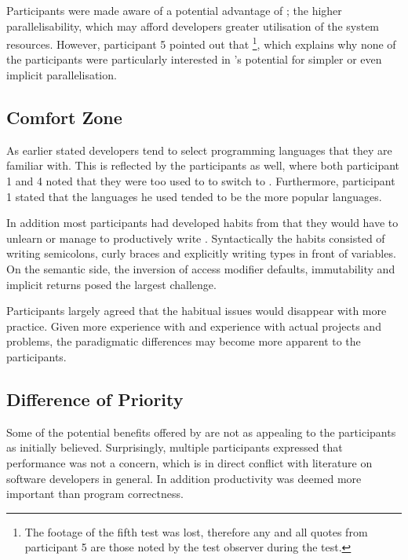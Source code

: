 Participants were made aware of a potential advantage of \fs; the higher parallelisability, which may afford developers greater utilisation of the system resources. However, participant 5 pointed out that \footnote{The footage of the fifth test was lost, therefore any and all quotes from participant 5 are those noted by the test observer during the test.}, which explains why none of the participants were particularly interested in \fs's potential for simpler or even implicit parallelisation.

\subsection{Comfort Zone}
As earlier stated developers tend to select programming languages that they are familiar with\cite{meyerovich2013empirical}. This is reflected by the participants as well, where both participant 1 and 4 noted that they were too used to \cs to switch to \fs. Furthermore, participant 1 stated that the languages he used tended to be the more popular languages.


In addition most participants had developed habits from \cs that they would have to unlearn or manage to productively write \fs. Syntactically the habits consisted of writing semicolons, curly braces and explicitly writing types in front of variables. On the semantic side, the inversion of access modifier defaults, immutability and implicit returns posed the largest challenge.



Participants largely agreed that the habitual issues would disappear with more practice. Given more experience with \fs and experience with actual projects and problems, the paradigmatic differences may become more apparent to the participants.

\subsection{Difference of Priority}
Some of the potential benefits offered by \fs are not as appealing to the participants as initially believed. Surprisingly, multiple  participants expressed that performance was not a concern, which is in direct conflict with literature on software developers in general\cite{meyerovich2013empirical}. In addition productivity was deemed more important than program correctness.

